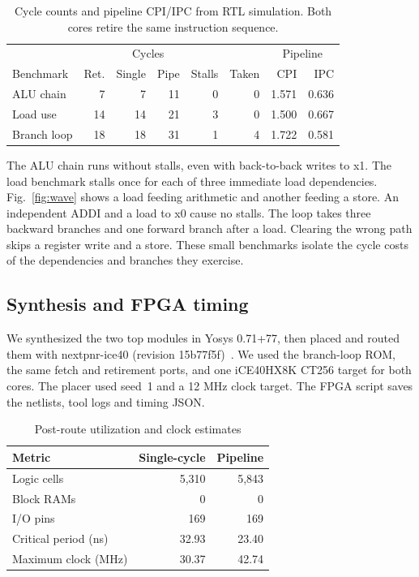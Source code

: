 \documentclass[conference]{IEEEtran}
\begin{document}
\begin{table}[!t]
\caption{Cycle counts and pipeline CPI/IPC from RTL simulation. Both cores retire the same instruction sequence.}
\label{tab:bench}\centering\footnotesize
\setlength{\tabcolsep}{2.3pt}
\begin{tabular}{lrrrrrrr}\hline
 & & \multicolumn{2}{c}{Cycles} & & & \multicolumn{2}{c}{Pipeline}\\
Benchmark & Ret. & Single & Pipe & Stalls & Taken & CPI & IPC\\\hline
ALU chain   &  7 &  7 & 11 & 0 & 0 & 1.571 & 0.636\\
Load use    & 14 & 14 & 21 & 3 & 0 & 1.500 & 0.667\\
Branch loop & 18 & 18 & 31 & 1 & 4 & 1.722 & 0.581\\\hline
\end{tabular}
\end{table}

The ALU chain runs without stalls, even with back-to-back writes to x1. The load benchmark stalls once for each of three immediate load dependencies. Fig.~\ref{fig:wave} shows a load feeding arithmetic and another feeding a store. An independent ADDI and a load to x0 cause no stalls. The loop takes three backward branches and one forward branch after a load. Clearing the wrong path skips a register write and a store. These small benchmarks isolate the cycle costs of the dependencies and branches they exercise.

\subsection{Synthesis and FPGA timing}
We synthesized the two top modules in Yosys 0.71+77, then placed and routed them with nextpnr-ice40 (revision 15b77f5f)~\cite{fpga}. We used the branch-loop ROM, the same fetch and retirement ports, and one iCE40HX8K CT256 target for both cores. The placer used seed~1 and a 12 MHz clock target. The FPGA script saves the netlists, tool logs and timing JSON.

\begin{table}[t]
\caption{Post-route utilization and clock estimates}
\label{tab:fpga}\centering
\begin{tabular}{lrr}\hline
Metric & Single-cycle & Pipeline\\\hline
Logic cells & 5,310 & 5,843\\
Block RAMs & 0 & 0\\
I/O pins & 169 & 169\\
Critical period (ns) & 32.93 & 23.40\\
Maximum clock (MHz) & 30.37 & 42.74\\\hline
\end{tabular}
\end{table}
\end{document}
